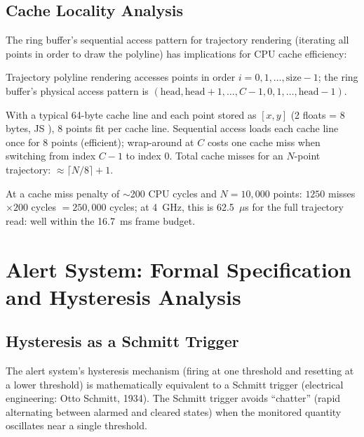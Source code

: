\subsection{Cache Locality Analysis}

The ring buffer's sequential access pattern for trajectory rendering (iterating all points in order to draw the polyline) has implications for CPU cache efficiency:

\begin{eqblock}
Trajectory polyline rendering accesses points in order $i=0,1,\dots,\text{size}-1$; the ring buffer's physical access pattern is $(\text{head}, \text{head}{+}1, \dots, C{-}1, 0, 1, \dots, \text{head}{-}1)$.

With a typical 64-byte cache line and each point stored as $[x,y]$ (2 floats = 8 bytes, JS ), 8 points fit per cache line. Sequential access loads each cache line once for 8 points (efficient); wrap-around at $C$ costs one cache miss when switching from index $C{-}1$ to index $0$. Total cache misses for an $N$-point trajectory: $\approx\lceil N/8\rceil+1$.

At a cache miss penalty of $\sim$200 CPU cycles and $N=10{,}000$ points: $1250$ misses $\times200$ cycles $=250{,}000$ cycles; at 4~GHz, this is 62.5~$\mu$s for the full trajectory read: well within the 16.7~ms frame budget.
\end{eqblock}

\section{Alert System: Formal Specification and Hysteresis Analysis}

\subsection{Hysteresis as a Schmitt Trigger}

The alert system's hysteresis mechanism (firing at one threshold and resetting at a lower threshold) is mathematically equivalent to a Schmitt trigger (electrical engineering: Otto Schmitt, 1934). The Schmitt trigger avoids ``chatter'' (rapid alternating between alarmed and cleared states) when the monitored quantity oscillates near a single threshold.


